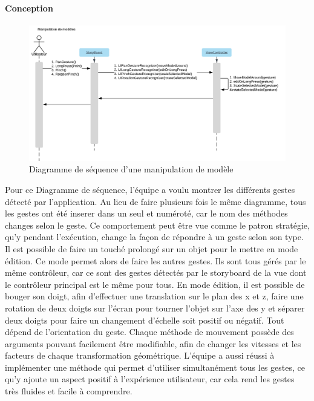 \documentclass[rapport.tex]{subfiles}
\begin{document}
\paragraph*{Conception}
\begin{figure}[H]
    \includegraphics[width=\textwidth]{DSS_ManipulationModels.png}
\centering
    \caption{Diagramme de séquence d'une manipulation de modèle}
\end{figure}
Pour ce Diagramme de séquence, l’équipe a voulu montrer les différents gestes détecté par l’application. Au lieu de faire plusieurs fois le même diagramme, tous les gestes ont été inserer dans un seul et numéroté, car le nom des méthodes changes selon le geste. Ce comportement peut être vue comme le patron stratégie, qu’y pendant l’exécution, change la façon de répondre à un geste selon son type. Il est possible de faire un touché prolongé sur un objet pour le mettre en mode édition. Ce mode permet alors de faire les autres gestes. Ils sont tous gérés par le même contrôleur, car ce sont des gestes détectés par le storyboard de la vue dont le contrôleur principal est le même pour tous. En mode édition, il est possible de bouger son doigt, afin d’effectuer une translation sur le plan des x et z, faire une rotation de deux doigts sur l’écran pour tourner l’objet sur l’axe des y et séparer deux doigts pour faire un changement d’échelle soit positif ou négatif. Tout dépend de l’orientation du geste. Chaque méthode de mouvement possède des arguments pouvant facilement être modifiable, afin de changer les vitesses et les facteurs de chaque transformation géométrique. L’équipe a aussi réussi à implémenter une méthode qui permet d’utiliser simultanément tous les gestes, ce qu’y ajoute un aspect positif à l’expérience utilisateur, car cela rend les gestes très fluides et facile à comprendre.
\end{document}

